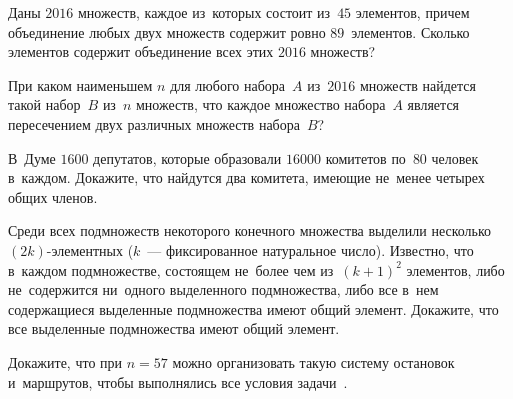 \begin{problems}
\item
Даны $2016$ множеств, каждое из~которых состоит из~$45$ элементов, причем
объединение любых двух множеств содержит ровно $89$~элементов.
Сколько элементов содержит объединение всех этих $2016$ множеств?

\item
При каком наименьшем $n$ для любого набора~$A$ из~$2016$ множеств найдется
такой набор~$B$ из~$n$ множеств, что каждое множество набора~$A$ является
пересечением двух различных множеств набора~$B$?

\item
В~Думе $1600$ депутатов, которые образовали $16000$ комитетов по~$80$ человек
в~каждом.
Докажите, что найдутся два комитета, имеющие не~менее четырех общих членов.

\item
Среди всех подмножеств некоторого конечного множества выделили несколько
$(2k)$-элементных ($k$~--- фиксированное натуральное число).
Известно, что в~каждом подмножестве, состоящем не~более чем
из~$(k + 1)^2$ элементов, либо не~содержится ни~одного выделенного
подмножества, либо все в~нем содержащиеся выделенные подмножества имеют общий
элемент.
Докажите, что все выделенные подмножества имеют общий элемент.

\item
Докажите, что при $n = 57$ можно организовать такую систему остановок
и~маршрутов, чтобы выполнялись все условия
задачи~.

\iffalse
\fi

\end{problems}

